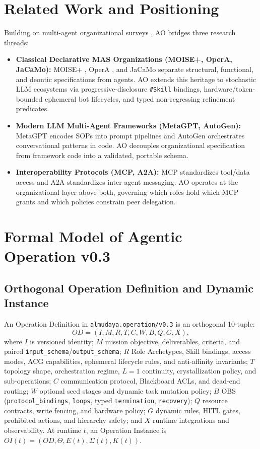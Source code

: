 \documentclass[11pt,a4paper]{article}
\begin{document}
\section{Related Work and Positioning}
Building on multi-agent organizational surveys \cite{horling2004survey,jennings2000agent,wooldridge2009introduction}, AO bridges three research threads:
\begin{itemize}
  \item \textbf{Classical Declarative MAS Organizations (MOISE+, OperA, JaCaMo):} MOISE+ \cite{hubner2007moise}, OperA \cite{dignum2004opera}, and JaCaMo \cite{boissier2013jacamo} separate structural, functional, and deontic specifications from agents. AO extends this heritage to stochastic LLM ecosystems via progressive-disclosure \texttt{\#Skill} bindings, hardware/token-bounded ephemeral bot lifecycles, and typed non-regressing refinement predicates.
  \item \textbf{Modern LLM Multi-Agent Frameworks (MetaGPT, AutoGen):} MetaGPT \cite{hong2024metagpt} encodes SOPs into prompt pipelines and AutoGen \cite{wu2023autogen} orchestrates conversational patterns in code. AO decouples organizational specification from framework code into a validated, portable schema.
  \item \textbf{Interoperability Protocols (MCP, A2A):} MCP \cite{anthropic2024mcp} standardizes tool/data access and A2A \cite{google2025a2a} standardizes inter-agent messaging. AO operates at the organizational layer above both, governing which roles hold which MCP grants and which policies constrain peer delegation.
\end{itemize}

\section{Formal Model of Agentic Operation v0.3}
\subsection{Orthogonal Operation Definition and Dynamic Instance}
An Operation Definition in \texttt{almudaya.operation/v0.3} is an orthogonal 10-tuple:
\begin{equation}
OD = (I, M, R, T, C, W, B, Q, G, X),
\end{equation}
where $I$ is versioned identity; $M$ mission objective, deliverables, criteria, and paired \texttt{input\_schema}/\texttt{output\_schema}; $R$ Role Archetypes, Skill bindings, access modes, ACG capabilities, ephemeral lifecycle rules, and anti-affinity invariants; $T$ topology shape, orchestration regime, $L=1$ continuity, crystallization policy, and sub-operations; $C$ communication protocol, Blackboard ACLs, and dead-end routing; $W$ optional seed stages and dynamic task mutation policy; $B$ OBS (\texttt{protocol\_bindings}, \texttt{loops}, typed \texttt{termination}, \texttt{recovery}); $Q$ resource contracts, write fencing, and hardware policy; $G$ dynamic rules, HITL gates, prohibited actions, and hierarchy safety; and $X$ runtime integrations and observability. At runtime $t$, an Operation Instance is $OI(t) = (OD, \Theta, E(t), \Sigma(t), K(t))$.
\end{document}
